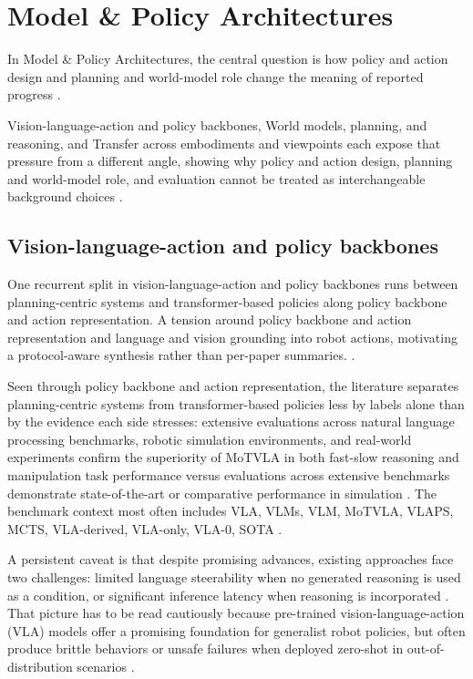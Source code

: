 \documentclass[a4paper,11pt]{article}
\begin{document}
\section{Model \& Policy Architectures}


In Model \& Policy Architectures, the central question is how policy and action design and planning and world-model role change the meaning of reported progress \citep{Shao2025Large,Gu2025Usim,Li2025Survey,Xu2025Anatomy}.

Vision-language-action and policy backbones, World models, planning, and reasoning, and Transfer across embodiments and viewpoints each expose that pressure from a different angle, showing why policy and action design, planning and world-model role, and evaluation cannot be treated as interchangeable background choices \citep{Zheng2025Soft,Yu2025Survey,Zhang2025Pure,Yadav2025Robust}.

\subsection{Vision-language-action and policy backbones}


One recurrent split in vision-language-action and policy backbones runs between planning-centric systems and transformer-based policies along policy backbone and action representation. A tension around policy backbone and action representation and language and vision grounding into robot actions, motivating a protocol-aware synthesis rather than per-paper summaries. \citep{Lisondra2025Embodied,Liu2026World,Long2025Survey,Mai2024From}.

Seen through policy backbone and action representation, the literature separates planning-centric systems from transformer-based policies less by labels alone than by the evidence each side stresses: extensive evaluations across natural language processing benchmarks, robotic simulation environments, and real-world experiments confirm the superiority of MoTVLA in both fast-slow reasoning and manipulation task performance versus evaluations across extensive benchmarks demonstrate state-of-the-art or comparative performance in simulation \citep{Huang2025Motvla,Zheng2025Soft,Hou2025Dita}. The benchmark context most often includes VLA, VLMs, VLM, MoTVLA, VLAPS, MCTS, VLA-derived, VLA-only, VLA-0, SOTA \citep{Huang2025Motvla,Neary2025Improving,Hou2025Dita,Zheng2025Soft}.

A persistent caveat is that despite promising advances, existing approaches face two challenges: limited language steerability when no generated reasoning is used as a condition, or significant inference latency when reasoning is incorporated \citep{Huang2025Motvla}. That picture has to be read cautiously because pre-trained vision-language-action (VLA) models offer a promising foundation for generalist robot policies, but often produce brittle behaviors or unsafe failures when deployed zero-shot in out-of-distribution scenarios \citep{Neary2025Improving}.
\end{document}
